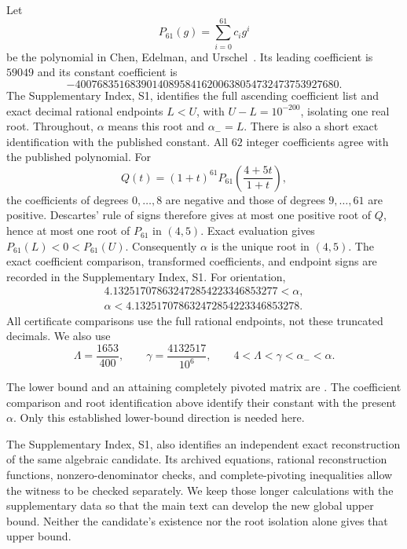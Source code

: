 \documentclass[11pt,reqno]{amsart}
\theoremstyle{definition}
\theoremstyle{remark}
\newcommand{\amin}{\alpha_-}
\newcommand{\gam}{\gamma}
\begin{document}
Let
\begin{equation}\label{eq:P61}
P_{61}(g)=\sum_{i=0}^{61}c_i g^i
\end{equation}
be the polynomial in Chen, Edelman, and
Urschel~\cite[Eq.~(2.15)]{ChenEdelmanUrschel2026}. Its leading coefficient is \(59049\)
and its constant coefficient is
\[
-400768351683901408958416200638054732473753927680.
\]
The Supplementary Index, S1, identifies the full ascending coefficient list
and exact decimal rational endpoints \(L<U\), with
\(U-L=10^{-200}\), isolating one real root. Throughout, \(\alpha\) means this root and \(\amin=L\).
There is also a short exact identification with the published constant.
All \(62\) integer coefficients agree with the published polynomial.
For
\[
Q(t)=(1+t)^{61}P_{61}\!\left(\frac{4+5t}{1+t}\right),
\]
the coefficients of degrees \(0,\ldots,8\) are negative and those
of degrees \(9,\ldots,61\) are positive.
Descartes' rule of signs therefore gives at most one positive root
of \(Q\), hence at most one root of \(P_{61}\) in \((4,5)\).
Exact evaluation gives \(P_{61}(L)<0<P_{61}(U)\).
Consequently \(\alpha\) is the unique root in \((4,5)\).
The exact coefficient comparison, transformed coefficients, and
endpoint signs are recorded in the Supplementary Index, S1.
For orientation,
\[
\begin{gathered}
4.132517078632472854223346853277<\alpha,\\
\alpha<4.132517078632472854223346853278.
\end{gathered}
\]
All certificate comparisons use the full rational endpoints, not these
truncated decimals. We also use
\begin{equation}\label{eq:thresholds}
\Lambda=\frac{1653}{400},\qquad
\gam=\frac{4132517}{10^6},\qquad
4<\Lambda<\gam<\amin<\alpha.
\end{equation}

The lower bound and an attaining completely pivoted matrix are
\cite[Theorem~2.2]{ChenEdelmanUrschel2026}. The coefficient comparison
and root identification above identify their constant with the present
\(\alpha\). Only this established lower-bound direction is needed here.

The Supplementary Index, S1, also identifies an independent exact
reconstruction of the same algebraic candidate. Its archived equations,
rational reconstruction functions, nonzero-denominator checks, and
complete-pivoting inequalities allow the witness to be checked separately.
We keep those longer calculations with the supplementary data so that
the main text can develop the new global upper bound. Neither the
candidate's existence nor the root isolation alone gives that upper bound.
\end{document}
